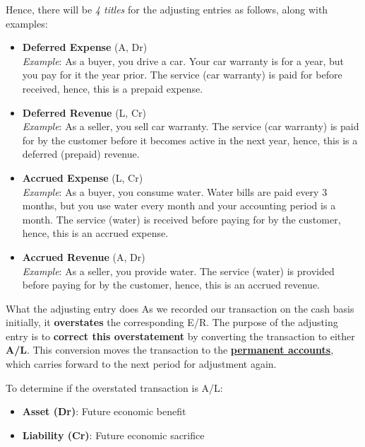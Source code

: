 Hence, there will be \textit{4 titles} for the adjusting entries as follows, along with examples:
\begin{itemize}
    \item \textbf{Deferred Expense} (A, Dr)\\
          \textit{Example}: As a buyer, you drive a car. Your car warranty is for a year, but you pay for it the year prior. The service (car warranty) is paid for before received, hence, this is a prepaid expense.

          \vspace{1em}
    \item \textbf{Deferred Revenue} (L, Cr)\\
          \textit{Example}: As a seller, you sell car warranty. The service (car warranty) is paid for by the customer before it becomes active in the next year, hence, this is a deferred (prepaid) revenue.

          \vspace{1em}
    \item \textbf{Accrued Expense} (L, Cr)\\
          \textit{Example}: As a buyer, you consume water. Water bills are paid every 3 months, but you use water every month and your accounting period is a month. The service (water) is received before paying for by the customer, hence, this is an accrued expense.

          \vspace{1em}
    \item \textbf{Accrued Revenue} (A, Dr)\\
          \textit{Example}: As a seller, you provide water. The service (water) is provided before paying for by the customer, hence, this is an accrued revenue.

          \vspace{1em}
\end{itemize}

\begin{theorem}
    {What the adjusting entry does}
    As we recorded our transaction on the cash basis initially, it \textbf{overstates} the corresponding E/R. The purpose of the adjusting entry is to \textbf{correct this overstatement} by converting the transaction to either \textbf{A/L}. This conversion moves the transaction to the \hyperref[def:temp_perm]{\textbf{permanent accounts}}, which carries forward to the next period for adjustment again.

    To determine if the overstated transaction is A/L:
    \begin{itemize}
        \item \textbf{Asset (Dr)}: Future economic benefit
        \item \textbf{Liability (Cr)}: Future economic sacrifice
    \end{itemize}
    \label{thm:adjusting_entry}
\end{theorem}

